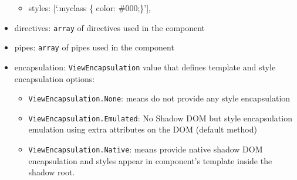 \documentclass[12pt,]{article}
\providecommand{\tightlist}{%
  \setlength{\itemsep}{0pt}\setlength{\parskip}{0pt}}
\begin{document}
\begin{itemize}
  \begin{itemize}
  \tightlist
  \item
    styles: {[}`.myclass \{ color: \#000;\}'{]},
  \end{itemize}
\item
  directives: \texttt{array} of directives used in the component
\item
  pipes: \texttt{array} of pipes used in the component
\item
  encapsulation: \texttt{ViewEncapsulation} value that defines template
  and style encapsulation options:

  \begin{itemize}
  \tightlist
  \item
    \texttt{ViewEncapsulation.None}: means do not provide any style
    encapsulation
  \item
    \texttt{ViewEncapsulation.Emulated}: No Shadow DOM but style
    encapsulation emulation using extra attributes on the DOM (default
    method)
  \item
    \texttt{ViewEncapsulation.Native}: means provide native shadow DOM
    encapsulation and styles appear in component's template inside the
    shadow root.
  \end{itemize}
\end{itemize}
\end{document}
